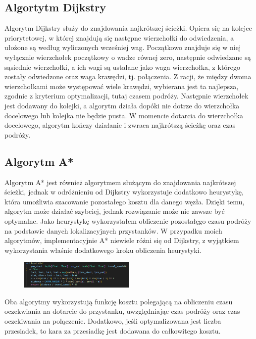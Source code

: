 \documentclass{article}
\begin{document}
\subsection*{Algortytm Dijkstry}
Algorytm Dijkstry służy do znajdowania najkrótszej ścieżki. Opiera się na kolejce priorytetowej, w której znajdują się następne wierzchołki do odwiedzenia, a ułożone są według wyliczonych wcześniej wag. Początkowo 
znajduje się w niej wyłącznie wierzchołek początkowy o wadze równej zero, następnie odwiedzane są sąsiednie wierzchołki, a ich wagi są ustalane jako waga wierzchołka, z którego zostały odwiedzone oraz waga krawędzi, tj. połączenia. Z racji, że 
między dwoma wierzchołkami może występować wiele krawędzi, wybierana jest ta najlepsza, zgodnie z kryterium optymalizacji, tutaj czasem podróży. Następnie wierzchołek jest dodawany do kolejki, a algorytm działa dopóki
nie dotrze do wierzchołka docelowego lub kolejka nie będzie pusta. W momencie dotarcia do wierzchołka docelowego, algorytm kończy działanie i zwraca najkrótszą ścieżkę oraz czas podróży.


\subsection*{Algorytm A*}
Algorytm A* jest również algorytmem służącym do znajdowania najkrótszej ścieżki, jednak w odróżnieniu od Dijkstry wykorzystuje dodatkowo heurystykę,
która umożliwia szacowanie pozostałego kosztu dla danego węzła. Dzięki temu, algorytm może działać szybciej, jednak rozwiązanie może nie zawsze być optymalne.
Jako heurystykę wykorzystałem obliczenie pozostałęgo czasu podróży na podstawie danych lokalizacyjnych przystanków. W przypadku moich algorytmów, implementacyjnie A* niewiele różni się od Dijkstry, z wyjątkiem wykorzystania właśnie dodatkowego kroku 
obliczenia heurystyki.

\begin{figure}[H]
    \centering
    \includegraphics[width=0.5\textwidth]{sc3.png}
\end{figure}

Oba algorytmy wykorzystują funkcję kosztu polegającą na obliczeniu czasu oczekwiania na dotarcie do przystanku, uwzględniając czas podróży oraz czas oczekiwania na polączenie. Dodatkowo, jeśli 
optymalizowana jest liczba przesiadek, to kara za przesiadkę jest dodawana do całkowitego kosztu.
\end{document}
